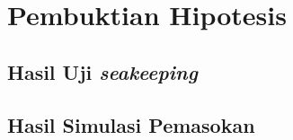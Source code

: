 \section{Pembuktian Hipotesis}
\label{sec:bukti-hipotesis}



\subsection{Hasil Uji \emph{seakeeping}}
\label{subsec:hasil-uji-seakeeping}



\subsection{Hasil Simulasi Pemasokan}
\label{subsec:simul-existing}